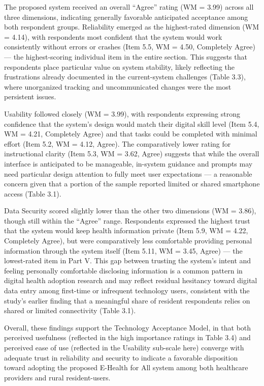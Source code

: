 \documentclass{research}
\begin{document}
\begin{table}[H]
\vspace{4pt}
\caption{Perceived Acceptability of the Proposed System}
\end{table}

The proposed system received an overall ``Agree'' rating (WM = 3.99) across all three dimensions, indicating generally favorable anticipated acceptance among both respondent groups. Reliability emerged as the highest-rated dimension (WM = 4.14), with respondents most confident that the system would work consistently without errors or crashes (Item 5.5, WM = 4.50, Completely Agree) --- the highest-scoring individual item in the entire section. This suggests that respondents place particular value on system stability, likely reflecting the frustrations already documented in the current-system challenges (Table 3.3), where unorganized tracking and uncommunicated changes were the most persistent issues.

Usability followed closely (WM = 3.99), with respondents expressing strong confidence that the system's design would match their digital skill level (Item 5.4, WM = 4.21, Completely Agree) and that tasks could be completed with minimal effort (Item 5.2, WM = 4.12, Agree). The comparatively lower rating for instructional clarity (Item 5.3, WM = 3.62, Agree) suggests that while the overall interface is anticipated to be manageable, in-system guidance and prompts may need particular design attention to fully meet user expectations --- a reasonable concern given that a portion of the sample reported limited or shared smartphone access (Table 3.1).

Data Security scored slightly lower than the other two dimensions (WM = 3.86), though still within the ``Agree'' range. Respondents expressed the highest trust that the system would keep health information private (Item 5.9, WM = 4.22, Completely Agree), but were comparatively less comfortable providing personal information through the system itself (Item 5.11, WM = 3.45, Agree) --- the lowest-rated item in Part V. This gap between trusting the system's intent and feeling personally comfortable disclosing information is a common pattern in digital health adoption research and may reflect residual hesitancy toward digital data entry among first-time or infrequent technology users, consistent with the study's earlier finding that a meaningful share of resident respondents relies on shared or limited connectivity (Table 3.1).

Overall, these findings support the Technology Acceptance Model, in that both perceived usefulness (reflected in the high importance ratings in Table 3.4) and perceived ease of use (reflected in the Usability sub-scale here) converge with adequate trust in reliability and security to indicate a favorable disposition toward adopting the proposed E-Health for All system among both healthcare providers and rural resident-users.
\end{document}
